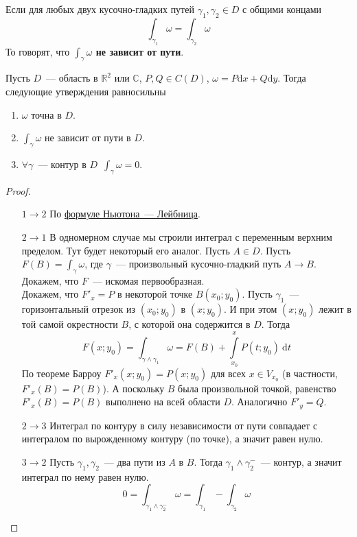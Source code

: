 \documentclass{article}
\begin{document}
    \begin{definition}
        Если для любых двух кусочно-гладких путей $\gamma_1,\gamma_2\in D$ с общими концами
        $$\int_{\gamma_1}\omega=\int_{\gamma_2}\omega$$
        То говорят, что \textbf{$\int_\gamma\omega$ не зависит от пути}.
    \end{definition}
    \begin{theorem}
        Пусть $D$~--- область в $\mathbb R^2$ или $\mathbb C$, $P,Q\in C(D)$, $\omega=P\mathrm dx+Q\mathrm dy$. Тогда следующие утверждения равносильны
        \begin{enumerate}
            \item $\omega$ точна в $D$.
            \item $\int_\gamma\omega$ не зависит от пути в $D$.
            \item $\forall\gamma$~--- контур в $D$~$\int_\gamma\omega=0$.
        \end{enumerate}
    \end{theorem}
    \begin{proof}
        \begin{enumerate}
            \item[$1\to2$] По \hyperref[Формула НЛ для криволинейных интегралов]{формуле Ньютона~--- Лейбница}.
            \item[$2\to1$] В одномерном случае мы строили интеграл с переменным верхним пределом. Тут будет некоторый его аналог. Пусть $A\in D$. Пусть $F(B)=\int_\gamma\omega$, где $\gamma$~--- произвольный кусочно-гладкий путь $A\to B$. Докажем, что $F$~--- искомая первообразная.\\
            Докажем, что $F'_x=P$ в некоторой точке $B(x_0;y_0)$. Пусть $\gamma_1$~--- горизонтальный отрезок из $(x_0;y_0)$ в $(x;y_0)$. И при этом $(x;y_0)$ лежит в той самой окрестности $B$, с которой она содержится в $D$. Тогда 
            $$
            F(x;y_0)=\int_{\gamma\wedge\gamma_1}\omega=F(B)+\int\limits_{x_0}^x P(t;y_0)~\mathrm dt
            $$
            По теореме Барроу $F'_x(x;y_0)=P(x;y_0)$ для всех $x\in V_{x_0}$ (в частности, $F'_x(B)=P(B)$). А поскольку $B$ была произвольной точкой, равенство $F'_x(B)=P(B)$ выполнено на всей области $D$. Аналогично $F'_y=Q$.
            \item[$2\to3$] Интеграл по контуру в силу независимости от пути совпадает с интегралом по вырожденному контуру (по точке), а значит равен нулю.
            \item[$3\to2$] Пусть $\gamma_1,\gamma_2$~--- два пути из $A$ в $B$. Тогда $\gamma_1\wedge\gamma_2^-$~--- контур, а значит интеграл по нему равен нулю.
            $$
            0=\int_{\gamma_1\wedge\gamma_2^-}\omega=\int_{\gamma_1}-\int_{\gamma_2}\omega
            $$
        \end{enumerate}
    \end{proof}
\end{document}
